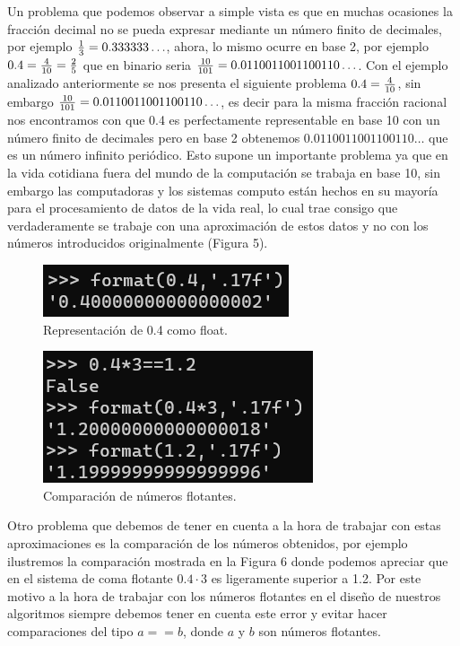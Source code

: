 \documentclass[a4paper,10pt,twocolumn]{article}
\begin{document}
	Un problema que podemos observar a simple vista es que en muchas ocasiones la fracción decimal no se pueda expresar mediante un número finito de decimales, por ejemplo ${1\over 3}=0.333333\ldots$, ahora, lo mismo ocurre en base 2, por ejemplo $0.4={4\over 10}={2\over 5}$ que en binario seria ${10\over 101}=0.0110011001100110\ldots$. Con el ejemplo analizado anteriormente se nos presenta el siguiente problema $0.4={4\over 10}$, sin embargo ${10\over 101}=0.0110011001100110\ldots$, es decir para la misma fracción racional nos encontramos con que 0.4 es perfectamente representable en base 10 con un número finito de decimales pero en base 2 obtenemos $0.0110011001100110\ldots$ que es un número infinito periódico. Esto supone un importante problema ya que en la vida cotidiana fuera del mundo de la computación se trabaja en base 10, sin embargo las computadoras y los sistemas computo están hechos en su mayoría para el procesamiento de datos de la vida real, lo cual trae consigo que verdaderamente se trabaje con una aproximación de estos datos y no con los números introducidos originalmente (Figura 5).
	
	\begin{figure}
		\begin{center}
			\includegraphics[scale=1]{recourses/repre04.png}
			\caption{Representación de 0.4 como float.\label{fig:code}}
		\end{center}
	\end{figure}
	
	\begin{figure}
		\begin{center}
			\includegraphics[scale=1]{recourses/comp04mult3.png}
			\caption{Comparación de números flotantes.\label{fig:code}}
		\end{center}
	\end{figure}
	
	Otro problema que debemos de tener en cuenta a la hora de trabajar con estas aproximaciones es la comparación de los números obtenidos, por ejemplo ilustremos la comparación mostrada en la Figura 6 donde podemos apreciar que en el sistema de coma flotante $0.4\cdot 3$ es ligeramente superior a 1.2. Por este motivo a la hora de trabajar con los números flotantes en el diseño de nuestros algoritmos siempre debemos tener en cuenta este error y evitar hacer comparaciones del tipo $a==b$, donde $a$ y $b$ son números flotantes.
\end{document}
